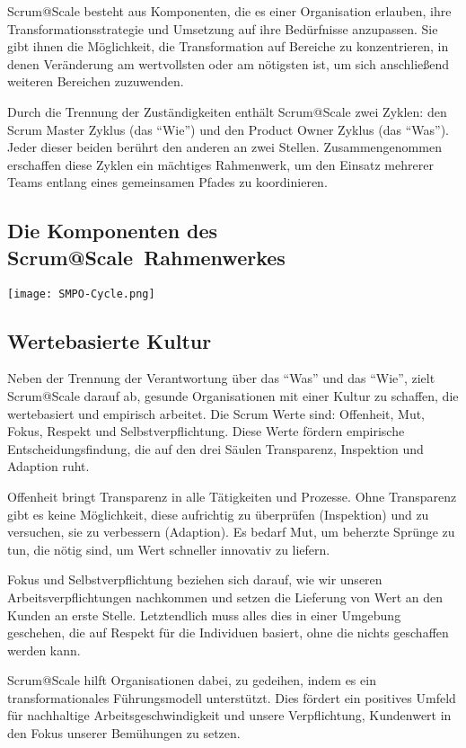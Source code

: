 \documentclass[12pt,a4paper,parskip=full]{scrartcl}
\begin{document}
Scrum@Scale besteht aus Komponenten, die es einer Organisation erlauben, ihre
Transformationsstrategie und Umsetzung auf ihre Bedürfnisse anzupassen. Sie gibt
ihnen die Möglichkeit, die Transformation auf Bereiche zu konzentrieren, in
denen Veränderung am wertvollsten oder am nötigsten ist, um sich anschließend
weiteren Bereichen zuzuwenden.

Durch die Trennung der Zuständigkeiten enthält Scrum@Scale zwei Zyklen: den
Scrum Master Zyklus (das ``Wie'') und den Product Owner Zyklus (das ``Was'').
Jeder dieser beiden berührt den anderen an zwei Stellen. Zusammengenommen
erschaffen diese Zyklen ein mächtiges Rahmenwerk, um den Einsatz mehrerer Teams
entlang eines gemeinsamen Pfades zu koordinieren.

\subsection{Die Komponenten des Scrum@Scale\textregistered ~Rahmenwerkes}

\texttt{[image: SMPO-Cycle.png]}

\subsection{Wertebasierte Kultur}
Neben der Trennung der Verantwortung über das ``Was'' und das ``Wie'', zielt
Scrum@Scale darauf ab, gesunde Organisationen mit einer Kultur zu schaffen, die
wertebasiert und empirisch arbeitet. Die Scrum Werte sind:
Offenheit, Mut, Fokus, Respekt und Selbstverpflichtung. Diese Werte fördern
empirische Entscheidungsfindung, die auf den drei Säulen
Transparenz, Inspektion und Adaption ruht.

Offenheit bringt Transparenz in alle Tätigkeiten und Prozesse. Ohne Transparenz
gibt es keine Möglichkeit, diese aufrichtig zu überprüfen (Inspektion) und zu
versuchen, sie zu verbessern (Adaption). Es bedarf Mut, um beherzte Sprünge zu
tun, die nötig sind, um Wert schneller innovativ zu liefern.

Fokus und Selbstverpflichtung beziehen sich darauf, wie wir unseren
Arbeitsverpflichtungen nachkommen und setzen die Lieferung von Wert an den
Kunden an erste Stelle. Letztendlich muss alles dies in einer Umgebung
geschehen, die auf Respekt für die Individuen basiert, ohne die nichts
geschaffen werden kann.

Scrum@Scale hilft Organisationen dabei, zu gedeihen, indem es ein
transformationales Führungsmodell unterstützt. Dies fördert ein positives
Umfeld für nachhaltige Arbeitsgeschwindigkeit und unsere Verpflichtung,
Kundenwert in den Fokus unserer Bemühungen zu setzen.
\end{document}
